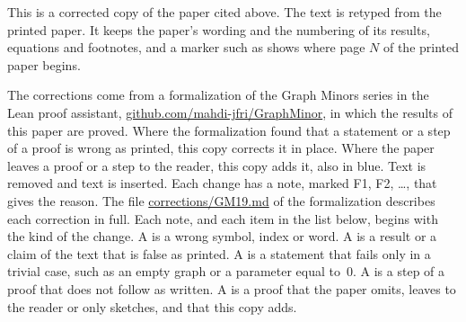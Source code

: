 
This is a corrected copy of the paper cited above. The text is retyped from the printed paper.
It keeps the paper's wording and the numbering of its results, equations and footnotes, and a
marker such as  shows where page $N$ of the printed paper begins.

The corrections come from a formalization of the Graph Minors series in the Lean proof
assistant, \href{https://github.com/mahdi-jfri/GraphMinor}{github.com/mahdi-jfri/GraphMinor},
in which the results of this paper are proved. Where the formalization found that a statement
or a step of a proof is wrong as printed, this copy corrects it in place. Where the paper leaves a proof or a step to the reader, this
copy adds it, also in blue. Text  is removed and text  is inserted. Each change has a note, marked
\textcolor{fixcolor}{\sffamily F1}, \textcolor{fixcolor}{\sffamily F2}, \dots, that gives the
reason. The file
\href{https://github.com/mahdi-jfri/GraphMinor/blob/main/corrections/GM19.md}{corrections/GM19.md}
of the formalization describes each correction in full. Each note, and each item in the list below, begins with the kind of the change. A  is a wrong symbol, index or word. A  is a result or a claim of the text that is false as printed. A  is a statement that fails only in a trivial case, such as an empty graph or a parameter equal to~$0$. A  is a step of a proof that does not follow as written. A  is a proof that the paper omits, leaves to the reader or only sketches, and that this copy adds.


